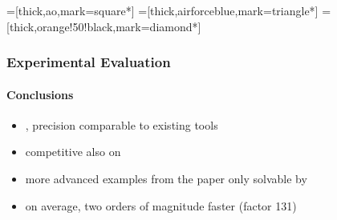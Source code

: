 \documentclass[
11pt,
usepdftitle=false,
aspectratio=169,
xcolor={table,usenames,dvipsnames},
]{beamer}
\begin{document}
=[thick,ao,mark=square*]
=[thick,airforceblue,mark=triangle*]
=[thick,orange!50!black,mark=diamond*]


\begin{frame}
  \frametitle{Experimental Evaluation}
  \framesubtitle{Conclusions}

  \begin{itemize}
  \item {}, precision comparable to existing tools \smallskip
  \item competitive also on  \smallskip
  \item more advanced examples from the paper only solvable by \ecoimp \smallskip
  \end{itemize}
  \bigskip

  \begin{itemize}
  \item on average, two orders of magnitude faster (factor 131)
  \end{itemize}
\end{frame}
\end{document}
